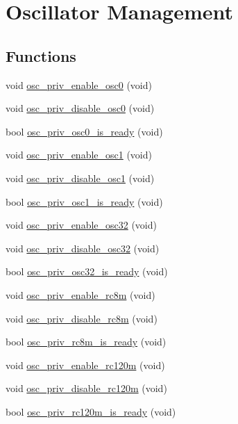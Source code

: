 \hypertarget{group__osc__group}{
\section{\-Oscillator \-Management}
\label{group__osc__group}
}
\subsection*{\-Functions}
\begin{DoxyCompactItemize}
\item 
void \hyperlink{group__osc__group_ga788c37dfdae9420f469a6b3b5f6acf9d}{osc\-\_\-priv\-\_\-enable\-\_\-osc0} (void)
\item 
void \hyperlink{group__osc__group_ga173ad48049211628cd7270db377f79fb}{osc\-\_\-priv\-\_\-disable\-\_\-osc0} (void)
\item 
bool \hyperlink{group__osc__group_ga423a37787d60aa4d2d18fa4f9f1c340d}{osc\-\_\-priv\-\_\-osc0\-\_\-is\-\_\-ready} (void)
\item 
void \hyperlink{group__osc__group_ga1d6850e50451263f1050560925d945cb}{osc\-\_\-priv\-\_\-enable\-\_\-osc1} (void)
\item 
void \hyperlink{group__osc__group_ga6b4e531753deac703af293fd02a66c3b}{osc\-\_\-priv\-\_\-disable\-\_\-osc1} (void)
\item 
bool \hyperlink{group__osc__group_ga23faff95a37c65ae40c3e598f52e76b1}{osc\-\_\-priv\-\_\-osc1\-\_\-is\-\_\-ready} (void)
\item 
void \hyperlink{group__osc__group_ga6aa18a93d28ef7a49f114fcbbd396a0b}{osc\-\_\-priv\-\_\-enable\-\_\-osc32} (void)
\item 
void \hyperlink{group__osc__group_ga8aa3436d99096cfbbfeb97ace773d2fb}{osc\-\_\-priv\-\_\-disable\-\_\-osc32} (void)
\item 
bool \hyperlink{group__osc__group_ga6e30883009316673303f6814718e7c99}{osc\-\_\-priv\-\_\-osc32\-\_\-is\-\_\-ready} (void)
\item 
void \hyperlink{group__osc__group_gac40b74aa2d9a39b612080aa89a33fe41}{osc\-\_\-priv\-\_\-enable\-\_\-rc8m} (void)
\item 
void \hyperlink{group__osc__group_gafb20af853c5bdf6c9328864edfc082bc}{osc\-\_\-priv\-\_\-disable\-\_\-rc8m} (void)
\item 
bool \hyperlink{group__osc__group_ga35d3ad0420da939f3bb6e51d3c997eb6}{osc\-\_\-priv\-\_\-rc8m\-\_\-is\-\_\-ready} (void)
\item 
void \hyperlink{group__osc__group_ga0cf5b9803bc9ab929af6d120c1a3275a}{osc\-\_\-priv\-\_\-enable\-\_\-rc120m} (void)
\item 
void \hyperlink{group__osc__group_ga98bbe496012d424da09d21a112cedef8}{osc\-\_\-priv\-\_\-disable\-\_\-rc120m} (void)
\item 
bool \hyperlink{group__osc__group_ga145305d3b97ea65d68fc0ec657031cae}{osc\-\_\-priv\-\_\-rc120m\-\_\-is\-\_\-ready} (void)
\end{DoxyCompactItemize}
